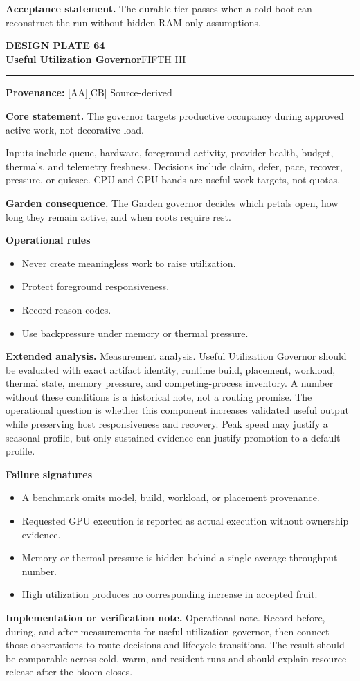 \documentclass[10pt,letterpaper,oneside]{article}
\newcommand{\prov}[1]{\textcolor{gardenBlue}{\sffamily\footnotesize\textbf{Provenance:} #1}}
\newcommand{\platetitle}[3]{%
  \begin{minipage}[t][0.54in][t]{\textwidth}
  {\sffamily\bfseries\color{gardenDeep}\fontsize{9}{10}\selectfont DESIGN PLATE #1}\\[-1pt]
  {\sffamily\bfseries\color{gardenInk}\fontsize{16.5}{18}\selectfont #2}\hfill{\sffamily\color{gardenGreen}\large #3}
  \end{minipage}\vspace{-2pt}\hrule\vspace{5pt}}
\begin{document}
\begin{acceptbox}
\textbf{Acceptance statement.} The durable tier passes when a cold boot can reconstruct the run without hidden RAM-only assumptions.
\end{acceptbox}
\newpage
\platetitle{64}{Useful Utilization Governor}{FIFTH III}
\prov{[AA][CB] Source-derived}
\fontsize{8.85}{10.45}\selectfont
\begin{corebox}
\textbf{Core statement.} The governor targets productive occupancy during approved active work, not decorative load.
\end{corebox}
Inputs include queue, hardware, foreground activity, provider health, budget, thermals, and telemetry freshness. Decisions include claim, defer, pace, recover, pressure, or quiesce. CPU and GPU bands are useful-work targets, not quotas.

\textbf{Garden consequence.} The Garden governor decides which petals open, how long they remain active, and when roots require rest.

\textbf{Operational rules}
\begin{itemize}
\item Never create meaningless work to raise utilization.
\item Protect foreground responsiveness.
\item Record reason codes.
\item Use backpressure under memory or thermal pressure.
\end{itemize}
\textbf{Extended analysis.} Measurement analysis. Useful Utilization Governor should be evaluated with exact artifact identity, runtime build, placement, workload, thermal state, memory pressure, and competing-process inventory. A number without these conditions is a historical note, not a routing promise. The operational question is whether this component increases validated useful output while preserving host responsiveness and recovery. Peak speed may justify a seasonal profile, but only sustained evidence can justify promotion to a default profile.

\textbf{Failure signatures}
\begin{itemize}
\item A benchmark omits model, build, workload, or placement provenance.
\item Requested GPU execution is reported as actual execution without ownership evidence.
\item Memory or thermal pressure is hidden behind a single average throughput number.
\item High utilization produces no corresponding increase in accepted fruit.
\end{itemize}
\textbf{Implementation or verification note.} Operational note. Record before, during, and after measurements for useful utilization governor, then connect those observations to route decisions and lifecycle transitions. The result should be comparable across cold, warm, and resident runs and should explain resource release after the bloom closes.
\end{document}
